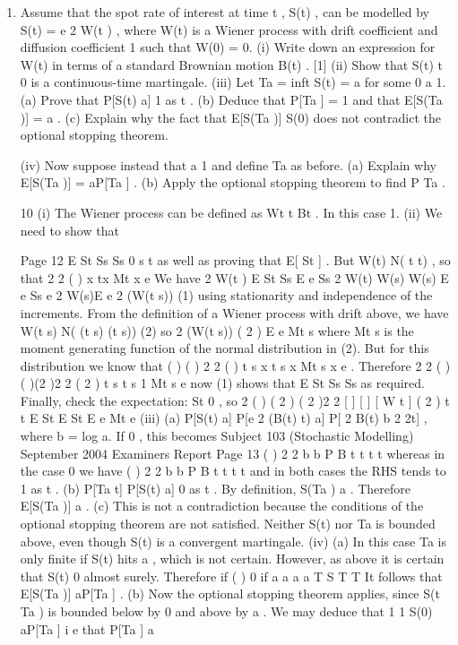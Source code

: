 \begin{enumerate}
\item 
Assume that the spot rate of interest at time t , S(t) , can be modelled by S(t) = e 2 W(t ) , where W(t) is a Wiener process with drift coefficient and diffusion coefficient 1 such that W(0) = 0.
(i) Write down an expression for W(t) in terms of a standard Brownian motion
B(t) . [1]
(ii) Show that {S(t) t 0} is a continuous-time martingale. 
(iii) Let Ta = inf{t S(t) = a} for some 0 a 1.
(a) Prove that P[S(t) a] 1 as t .
(b) Deduce that P[Ta ] = 1 and that E[S(Ta )] = a .
(c) Explain why the fact that E[S(Ta )] S(0) does not contradict the optional stopping theorem.

(iv) Now suppose instead that a 1 and define Ta as before.
(a) Explain why E[S(Ta )] = aP[Ta ] .
(b) Apply the optional stopping theorem to find P Ta .

10 (i) The Wiener process can be defined as Wt t Bt . In this case 1.
(ii) We need to show that

Page 12
E St Ss Ss 0 s t
as well as proving that E[ St ] .
But W(t) N( t t) , so that
2 2 ( ) x tx
Mt x e
We have
2 W(t )
E St Ss E e Ss
2 W(t) W(s) W(s)
E e Ss
e 2 W(s)E e 2 (W(t s)) (1)
using stationarity and independence of the increments.
From the definition of a Wiener process with drift above, we have
W(t s) N( (t s) (t s)) (2)
so
2 (W(t s)) ( 2 )
E e Mt s
where Mt s is the moment generating function of the normal distribution in
(2). But for this distribution we know that
( ) ( ) 2 2 ( ) t s x t s x
Mt s x e .
Therefore
2 2 ( ) ( )(2 )2 2 ( 2 ) t s t s 1
Mt s e
now (1) shows that E St Ss Ss as required.
Finally, check the expectation: St 0 , so
2 ( ) ( 2 ) ( 2 )2 2 [ ] [ ] [ W t ] ( 2 ) t t
E St E St E e Mt e
(iii) (a) P[S(t) a] P[e 2 (B(t) t) a] P[ 2 B(t) b 2 2t] , where
b = log a. If 0 , this becomes
Subject 103 (Stochastic Modelling) September 2004 Examiners Report
Page 13
( )
2 2
b b
P B t t t
t
whereas in the case 0 we have
( )
2 2
b b
P B t t t
t
and in both cases the RHS tends to 1 as t .
(b) P[Ta t] P[S(t) a] 0 as t .
By definition, S(Ta ) a . Therefore E[S(Ta )] a .
(c) This is not a contradiction because the conditions of the optional
stopping theorem are not satisfied. Neither S(t) nor Ta is bounded
above, even though S(t) is a convergent martingale.
(iv) (a) In this case Ta is only finite if S(t) hits a , which is not certain.
However, as above it is certain that S(t) 0 almost surely.
Therefore
if
( )
0 if
a
a
a
a T
S T
T
It follows that E[S(Ta )] aP[Ta ] .
(b) Now the optional stopping theorem applies, since S(t Ta ) is bounded
below by 0 and above by a .
We may deduce that
1
1 S(0) aP[Ta ] i e that P[Ta ]
a


\end{enumerate}
